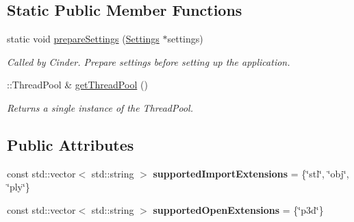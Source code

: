 \subsection*{Static Public Member Functions}
\begin{DoxyCompactItemize}
\item 
\mbox{\label{classpepr3d_1_1_main_application_a2cdfe5b197e302f0097e62cb7ba7c47c}} 
static void \mbox{\hyperlink{classpepr3d_1_1_main_application_a2cdfe5b197e302f0097e62cb7ba7c47c}{prepare\+Settings}} (\mbox{\hyperlink{classpepr3d_1_1_settings}{Settings}} $\ast$settings)
\begin{DoxyCompactList}\small\item\em Called by Cinder. Prepare settings before setting up the application. \end{DoxyCompactList}\item 
\mbox{\label{classpepr3d_1_1_main_application_a09c365abb40896d8d680b311b352c726}} 
\+::Thread\+Pool \& \mbox{\hyperlink{classpepr3d_1_1_main_application_a09c365abb40896d8d680b311b352c726}{get\+Thread\+Pool}} ()
\begin{DoxyCompactList}\small\item\em Returns a single instance of the Thread\+Pool. \end{DoxyCompactList}\end{DoxyCompactItemize}
\subsection*{Public Attributes}
\begin{DoxyCompactItemize}
\item 
\mbox{\label{classpepr3d_1_1_main_application_a33cbcb0bc0f82a9c5e999896790327da}} 
const std\+::vector$<$ std\+::string $>$ {\bfseries supported\+Import\+Extensions} = \{\char`\"{}stl\char`\"{}, \char`\"{}obj\char`\"{}, \char`\"{}ply\char`\"{}\}
\item 
\mbox{\label{classpepr3d_1_1_main_application_a6dc274ba0f11ff91cef2cebb39dad823}} 
const std\+::vector$<$ std\+::string $>$ {\bfseries supported\+Open\+Extensions} = \{\char`\"{}p3d\char`\"{}\}
\end{DoxyCompactItemize}
